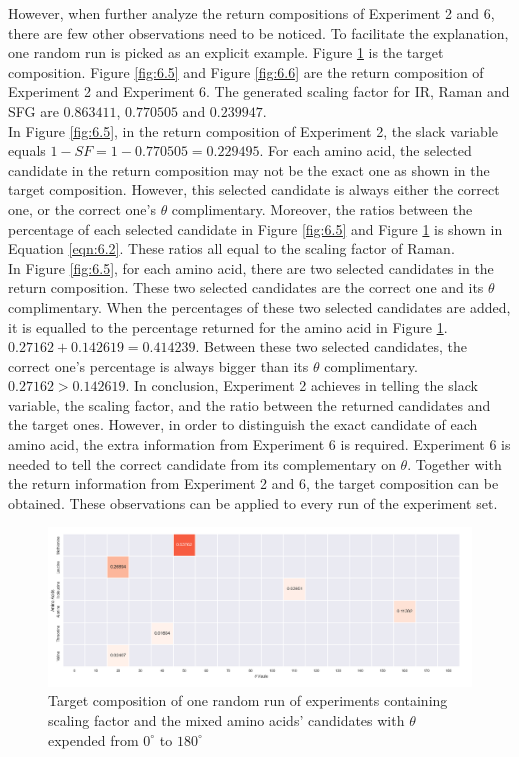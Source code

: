 However, when further analyze the return compositions of Experiment 2 and 6, there are few other observations need to be noticed. To facilitate the explanation, one random run is picked as an explicit example. Figure \ref{fig:6.4} is the target composition. Figure \ref{fig:6.5} and Figure \ref{fig:6.6} are the return composition of Experiment 2 and Experiment 6. The generated scaling factor for IR, Raman and SFG are $0.863411$, $0.770505$ and $0.239947$. \\

In Figure \ref{fig:6.5}, in the return composition of Experiment 2, the slack variable equals $1-SF = 1-0.770505 = 0.229495$. For each amino acid, the selected candidate in the return composition may not be the exact one as shown in the target composition. However, this selected candidate is always either the correct one, or the correct one's $\theta$ complimentary. Moreover, the ratios between the percentage of each selected candidate in Figure \ref{fig:6.5} and Figure \ref{fig:6.4} is shown in Equation \ref{eqn:6.2}. These ratios all equal to the scaling factor of Raman. \\

In Figure \ref{fig:6.5}, for each amino acid, there are two selected candidates in the return composition. These two selected candidates are the correct one and its $\theta$ complimentary. When the percentages of these two selected candidates are added, it is equalled to the percentage returned for the amino acid in Figure \ref{fig:6.4}. $0.27162 + 0.142619 = 0.414239$. Between these two selected candidates, the correct one's percentage is always bigger than its $\theta$ complimentary. $0.27162 > 0.142619$. In conclusion, Experiment 2 achieves in telling the slack variable, the scaling factor, and the ratio between the returned candidates and the target ones. However, in order to distinguish the exact candidate of each amino acid, the extra information from Experiment 6 is required. Experiment 6 is needed to tell the correct candidate from its complementary on $\theta$. Together with the return information from Experiment 2 and 6, the target composition can be obtained. These observations can be applied to every run of the experiment set.\\


\begin{figure}[!ht] 
\centering
\includegraphics[scale=0.5]{Figures/chapter6_figure_five.png}
\caption{Target composition of  one random run of experiments containing scaling factor and the mixed amino acids' candidates with $\theta$ expended from $0^{\circ}$ to $180^{\circ}$} \label{fig:6.4}
\end{figure}

